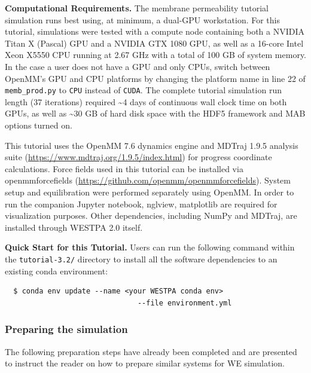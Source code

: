 \textbf{Computational Requirements.} The membrane permeability tutorial simulation runs best using, at minimum, a dual-GPU workstation. 
For this tutorial, simulations were tested with a compute node containing both a NVIDIA Titan X (Pascal) GPU and a NVIDIA GTX 1080 GPU, as well as a 16-core Intel Xeon X5550 CPU running at 2.67 GHz with a total of 100 GB of system memory. 
In the case a user does not have a GPU and only CPUs, switch between OpenMM's GPU and CPU platforms by changing the platform name in line 22 of \verb|memb_prod.py| to \verb|CPU| instead of \verb|CUDA|. 
The complete tutorial simulation run length (37 iterations) required \textasciitilde4 days of continuous wall clock time on both GPUs, as well as \textasciitilde30 GB of hard disk space with the HDF5 framework and MAB options turned on.

This tutorial uses the OpenMM 7.6 dynamics engine \citep{eastman_openmm_2017} and MDTraj 1.9.5 analysis suite ({\url{https://www.mdtraj.org/1.9.5/index.html}}) for progress coordinate calculations. 
Force fields used in this tutorial can be installed via openmmforcefields ({\url{https://github.com/openmm/openmmforcefields}}). 
System setup and equilibration were performed separately using OpenMM. 
In order to run the companion Jupyter notebook, nglview, matplotlib are required for visualization purposes. 
Other dependencies, including NumPy and MDTraj, are installed through WESTPA 2.0 itself.

\textbf{Quick Start for this Tutorial.} Users can run the following command within the \verb|tutorial-3.2/| directory to install all the software dependencies to an existing conda environment:

\begin{verbatim}
  $ conda env update --name <your WESTPA conda env> 
                               --file environment.yml
\end{verbatim}

\subsubsection{Preparing the simulation}
The following preparation steps have already been completed and are presented to instruct the reader on how to prepare similar systems for WE simulation.


